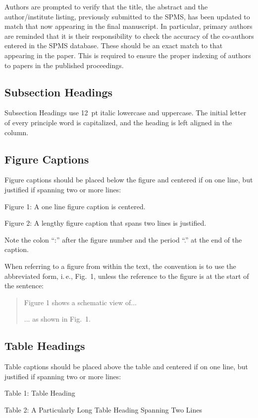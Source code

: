 \documentclass[letterpaper,  %
              ]{jacow-2_3}   %
\begin{document}
{{Authors are prompted to verify that the title, the abstract
and the author/institute listing, previously submitted
to the SPMS, has been updated to match that now appearing
in the final manuscript. In particular, primary authors
are reminded that it is their responsibility to check the
accuracy of the co-authors entered in the SPMS database.
These should be an exact match to that appearing in the
paper. This is required to ensure the proper indexing of
authors to papers in the published proceedings.

\subsection{Subsection Headings}

Subsection Headings use \SI{12}{pt} italic lowercase and uppercase.
The initial letter of every principle word is capitalized,
and the heading is left aligned in the column.

\subsection{Figure Captions}

Figure captions should be placed below the figure and
centered if on one line, but justified if spanning two or
more lines:
\begin{center}
	Figure 1: A one line figure caption is centered.
\end{center}
\begin{justify}
	Figure 2: A lengthy figure caption that spans 
	two lines is justified.
\end{justify}
Note the colon “:” after the figure number and the period
“.” at the end of the caption.

\newpage

When referring to a figure from within the text, the
convention is to use the abbreviated form, i.\,e., Fig.~1,
unless the reference to the figure is at the start of the sentence:
\begin{quote}
	Figure 1 shows a schematic view of...
	
	... as shown in Fig.~1.
\end{quote}

\subsection{Table Headings}

Table captions should be placed above the table and
centered if on one line, but justified if spanning two or
more lines:
\begin{center}
	Table 1: Table Heading
\end{center}
\begin{justify}
	Table 2: A Particularly Long Table Heading 
	Spanning Two Lines
\end{justify}

}}
\end{document}
